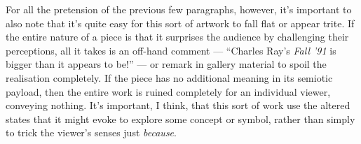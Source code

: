 \documentclass[a4paper,12pt]{article}
\begin{document}
For all the pretension of the previous few paragraphs, however, it's important to also note that it's quite easy for this sort of artwork to fall flat or appear trite. If the entire nature of a piece is that it surprises the audience by challenging their perceptions, all it takes is an off-hand comment --- ``Charles Ray's \textit{Fall
'91} is bigger than it appears to be!'' --- or remark in gallery material to spoil the realisation completely. If the piece has no additional meaning in its semiotic payload, then the entire work is ruined completely for an individual viewer, conveying nothing. It's important, I think, that this sort of work use the altered states that it might evoke to explore some concept or symbol, rather than simply to trick the viewer's senses just \textit{because}.
\end{document}

